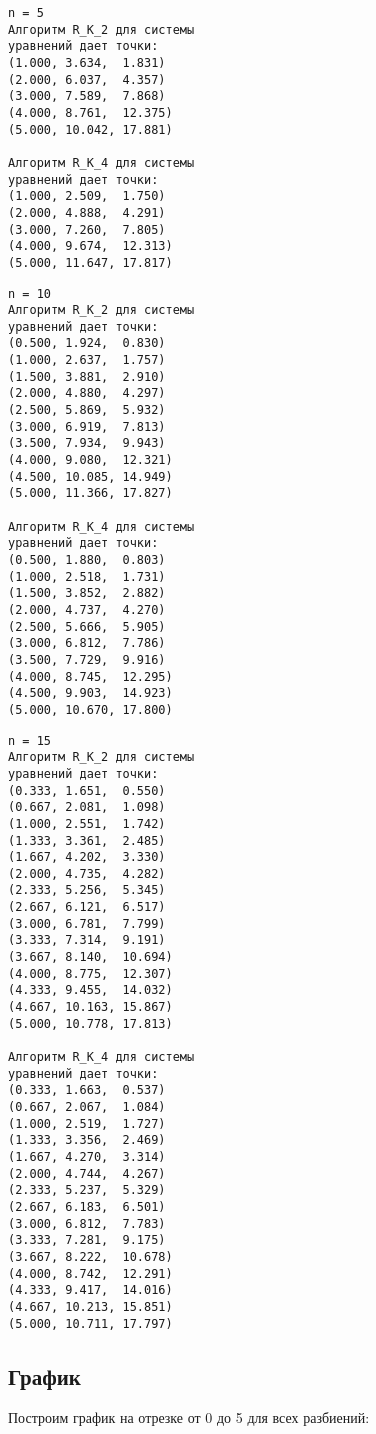 \documentclass[a4paper,12pt,titlepage,finall]{article}
\begin{document}
\begin{multicols}{3}

\begin{verbatim}
n = 5
Алгоритм R_K_2 для системы 
уравнений дает точки:
(1.000, 3.634,  1.831)
(2.000, 6.037,  4.357)
(3.000, 7.589,  7.868)
(4.000, 8.761,  12.375)
(5.000, 10.042, 17.881)

Алгоритм R_K_4 для системы 
уравнений дает точки:
(1.000, 2.509,  1.750)
(2.000, 4.888,  4.291)
(3.000, 7.260,  7.805)
(4.000, 9.674,  12.313)
(5.000, 11.647, 17.817)
\end{verbatim}

\columnbreak

\begin{verbatim}
n = 10
Алгоритм R_K_2 для системы 
уравнений дает точки:
(0.500, 1.924,  0.830)
(1.000, 2.637,  1.757)
(1.500, 3.881,  2.910)
(2.000, 4.880,  4.297)
(2.500, 5.869,  5.932)
(3.000, 6.919,  7.813)
(3.500, 7.934,  9.943)
(4.000, 9.080,  12.321)
(4.500, 10.085, 14.949)
(5.000, 11.366, 17.827)

Алгоритм R_K_4 для системы 
уравнений дает точки:
(0.500, 1.880,  0.803)
(1.000, 2.518,  1.731)
(1.500, 3.852,  2.882)
(2.000, 4.737,  4.270)
(2.500, 5.666,  5.905)
(3.000, 6.812,  7.786)
(3.500, 7.729,  9.916)
(4.000, 8.745,  12.295)
(4.500, 9.903,  14.923)
(5.000, 10.670, 17.800)
\end{verbatim}

\columnbreak
\begin{verbatim}
n = 15
Алгоритм R_K_2 для системы 
уравнений дает точки:
(0.333, 1.651,  0.550)
(0.667, 2.081,  1.098)
(1.000, 2.551,  1.742)
(1.333, 3.361,  2.485)
(1.667, 4.202,  3.330)
(2.000, 4.735,  4.282)
(2.333, 5.256,  5.345)
(2.667, 6.121,  6.517)
(3.000, 6.781,  7.799)
(3.333, 7.314,  9.191)
(3.667, 8.140,  10.694)
(4.000, 8.775,  12.307)
(4.333, 9.455,  14.032)
(4.667, 10.163, 15.867)
(5.000, 10.778, 17.813)

Алгоритм R_K_4 для системы 
уравнений дает точки:
(0.333, 1.663,  0.537)
(0.667, 2.067,  1.084)
(1.000, 2.519,  1.727)
(1.333, 3.356,  2.469)
(1.667, 4.270,  3.314)
(2.000, 4.744,  4.267)
(2.333, 5.237,  5.329)
(2.667, 6.183,  6.501)
(3.000, 6.812,  7.783)
(3.333, 7.281,  9.175)
(3.667, 8.222,  10.678)
(4.000, 8.742,  12.291)
(4.333, 9.417,  14.016)
(4.667, 10.213, 15.851)
(5.000, 10.711, 17.797)
\end{verbatim}

\end{multicols}

\newpage
\subsection{График}
Построим график на отрезке от 0 до 5 для всех разбиений:
\end{document}
